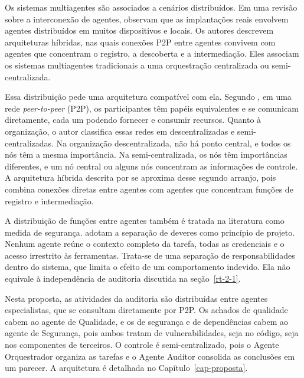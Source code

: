 Os sistemas multiagentes são associados a cenários distribuídos. Em uma revisão sobre a interconexão de agentes,  observam que as implantações reais envolvem agentes distribuídos em muitos dispositivos e locais. Os autores descrevem arquiteturas híbridas, nas quais conexões P2P entre agentes convivem com agentes que concentram o registro, a descoberta e a intermediação. Eles associam os sistemas multiagentes tradicionais a uma orquestração centralizada ou semi-centralizada.

Essa distribuição pede uma arquitetura compatível com ela. Segundo , em uma rede \textit{peer-to-peer} (P2P), os participantes têm papéis equivalentes e se comunicam diretamente, cada um podendo fornecer e consumir recursos. Quanto à organização, o autor classifica essas redes em descentralizadas e semi-centralizadas. Na organização descentralizada, não há ponto central, e todos os nós têm a mesma importância. Na semi-centralizada, os nós têm importâncias diferentes, e um nó central ou alguns nós concentram as informações de controle. A arquitetura híbrida descrita por  se aproxima desse segundo arranjo, pois combina conexões diretas entre agentes com agentes que concentram funções de registro e intermediação.

A distribuição de funções entre agentes também é tratada na literatura como medida de segurança.  adotam a separação de deveres como princípio de projeto. Nenhum agente reúne o contexto completo da tarefa, todas as credenciais e o acesso irrestrito às ferramentas. Trata-se de uma separação de responsabilidades dentro do sistema, que limita o efeito de um comportamento indevido. Ela não equivale à independência de auditoria discutida na seção~\ref{rt-2-1}.

Nesta proposta, as atividades da auditoria são distribuídas entre agentes especialistas, que se consultam diretamente por P2P. Os achados de qualidade cabem ao agente de Qualidade, e os de segurança e de dependências cabem ao agente de Segurança, pois ambos tratam de vulnerabilidades, seja no código, seja nos componentes de terceiros. O controle é semi-centralizado, pois o Agente Orquestrador organiza as tarefas e o Agente Auditor consolida as conclusões em um parecer. A arquitetura é detalhada no Capítulo~\ref{cap-proposta}.

